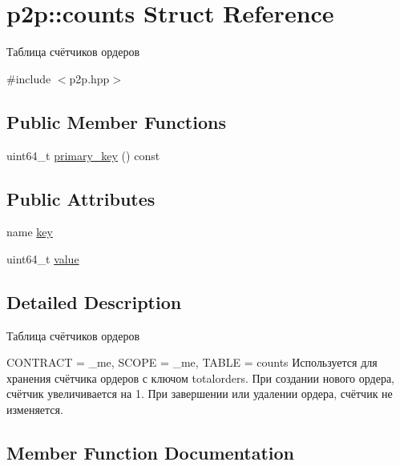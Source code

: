 \hypertarget{structp2p_1_1counts}{}\section{p2p\+:\+:counts Struct Reference}
\label{structp2p_1_1counts}


Таблица счётчиков ордеров  




{\ttfamily \#include $<$p2p.\+hpp$>$}

\subsection*{Public Member Functions}
\begin{DoxyCompactItemize}
\item 
uint64\+\_\+t \mbox{\hyperlink{structp2p_1_1counts_aef65d71b33a8ec444becd69edc9cd704}{primary\+\_\+key}} () const
\end{DoxyCompactItemize}
\subsection*{Public Attributes}
\begin{DoxyCompactItemize}
\item 
name \mbox{\hyperlink{structp2p_1_1counts_a020c8e7885212e936588e4bed5acb2d6}{key}}
\item 
uint64\+\_\+t \mbox{\hyperlink{structp2p_1_1counts_ababe8a6132ad10bc973c664c6a062749}{value}}
\end{DoxyCompactItemize}


\subsection{Detailed Description}
Таблица счётчиков ордеров 

C\+O\+N\+T\+R\+A\+CT = \+\_\+me, S\+C\+O\+PE = \+\_\+me, T\+A\+B\+LE = counts  Используется для хранения счётчика ордеров с ключом totalorders. При создании нового ордера, счётчик увеличивается на 1. При завершении или удалении ордера, счётчик не изменяется. 

\subsection{Member Function Documentation}
\mbox{\label{structp2p_1_1counts_aef65d71b33a8ec444becd69edc9cd704}} 
